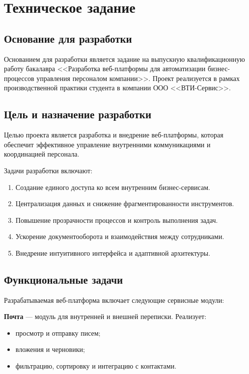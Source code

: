 \section{Техническое задание}

\subsection{Основание для разработки}

Основанием для разработки является задание на выпускную квалификационную работу бакалавра <<Разработка веб-платформы для автоматизации бизнес-процессов управления персоналом компании>>. Проект реализуется в рамках производственной практики студента в компании ООО <<ВТИ-Сервис>>.

\subsection{Цель и назначение разработки}

Целью проекта является разработка и внедрение веб-платформы, которая обеспечит эффективное управление внутренними коммуникациями и координацией персонала.

Задачи разработки включают:

\begin{enumerate}
  \item Создание единого доступа ко всем внутренним бизнес-сервисам.
  \item Централизация данных и снижение фрагментированности инструментов.
  \item Повышение прозрачности процессов и контроль выполнения задач.
  \item Ускорение документооборота и взаимодействия между сотрудниками.
  \item Внедрение интуитивного интерфейса и адаптивной архитектуры.
\end{enumerate}

\subsection{Функциональные задачи}

Разрабатываемая веб-платформа включает следующие сервисные модули:

  \textbf{Почта} — модуль для внутренней и внешней переписки. Реализует:
  \begin{itemize}
    \item просмотр и отправку писем;
    \item вложения и черновики;
    \item фильтрацию, сортировку и интеграцию с контактами.
  \end{itemize}

